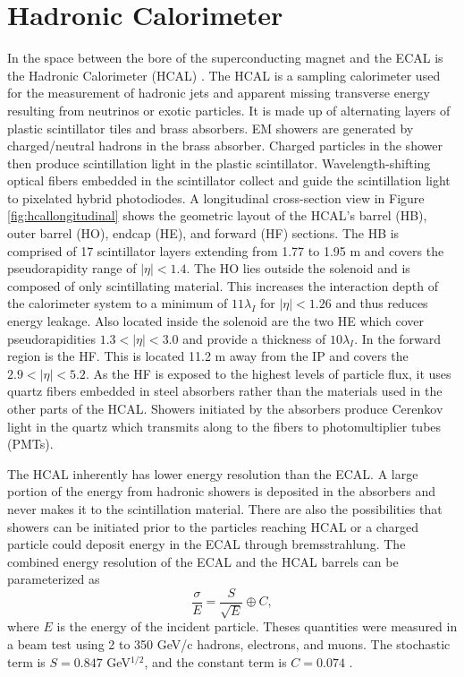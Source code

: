\section{Hadronic Calorimeter}
In the space between the bore of the superconducting magnet and the ECAL is the Hadronic Calorimeter (HCAL) \cite{CERN-LHCC-97-031}.  The HCAL is a sampling calorimeter used for the measurement of hadronic jets and apparent missing transverse energy resulting from neutrinos or exotic particles. It is made up of alternating layers of plastic scintillator tiles and brass absorbers.  EM showers are generated by charged/neutral hadrons in the brass absorber.  Charged particles in the shower then produce scintillation light in the plastic scintillator.  Wavelength-shifting optical fibers embedded in the scintillator collect and guide the scintillation light to pixelated hybrid photodiodes.  A longitudinal cross-section view in Figure \ref{fig:hcallongitudinal} shows the geometric layout of the HCAL's barrel (HB), outer barrel (HO), endcap (HE), and forward (HF) sections.  The HB is comprised of 17 scintillator layers extending from 1.77 to 1.95 m and covers the pseudorapidity range of $|\eta|<1.4$.  The HO lies outside the solenoid and is composed of only scintillating material.  This increases the interaction depth of the calorimeter system to a minimum of $11\lambda_I$ for $|\eta|<1.26$ and thus reduces energy leakage.  Also located inside the solenoid are the two HE which cover pseudorapidities $1.3<|\eta|<3.0$ and provide a thickness of $10\lambda_I$.  In the forward region is the HF.  This is located 11.2 m away from the IP and covers the $2.9<|\eta|<5.2$.  As the HF is exposed to the highest levels of particle flux, it uses quartz fibers embedded in steel absorbers rather than the materials used in the other parts of the HCAL. Showers initiated by the absorbers produce Cerenkov light in the quartz which transmits along to the fibers to photomultiplier tubes (PMTs).  

The HCAL inherently has lower energy resolution than the ECAL.  A large portion of the energy from hadronic showers is deposited in the absorbers and never makes it to the scintillation material.  There are also the possibilities that showers can be initiated prior to the particles reaching HCAL or a charged particle could deposit energy in the ECAL through bremsstrahlung.  The combined energy resolution of the ECAL and the HCAL barrels can be parameterized as
\begin{equation}
\frac{\sigma}{E} = \frac{S}{\sqrt{E}} \oplus C,	
\end{equation}
where $E$ is the energy of the incident particle.  Theses quantities were measured in a beam test using 2 to 350 GeV/c hadrons, electrons, and muons.  The stochastic term is $S=0.847$ GeV$^{1/2}$, and the constant term is $C=0.074$ \cite{Abdullin:2009zz}.


